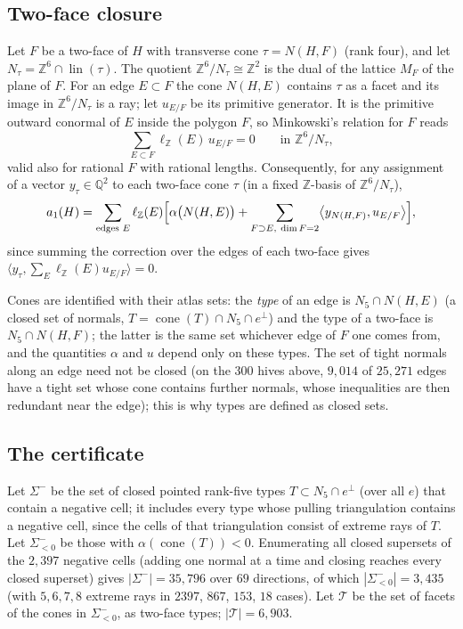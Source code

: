 \documentclass[11pt]{amsart}
\theoremstyle{definition}
\DeclareMathOperator{\cone}{cone}
\newcommand{\Z}{\mathbb{Z}}
\newcommand{\Q}{\mathbb{Q}}
\begin{document}
\subsection{Two-face closure}\label{sec:closure}
Let $F$ be a two-face of $H$ with transverse cone $\tau=N(H,F)$ (rank four),
and let $N_\tau=\Z^{6}\cap\operatorname{lin}(\tau)$. The quotient
$\Z^{6}/N_\tau\cong\Z^{2}$ is the dual of the lattice $M_F$ of the plane of
$F$. For an edge $E\subset F$ the cone $N(H,E)$ contains $\tau$ as a facet and
its image in $\Z^{6}/N_\tau$ is a ray; let $u_{E/F}$ be its primitive
generator. It is the primitive outward conormal of $E$ inside the polygon $F$,
so Minkowski's relation for $F$ reads
\begin{equation}\label{eq:polygon}
  \sum_{E\subset F}\ell_{\Z}(E)\,u_{E/F}=0\qquad\text{in }\Z^{6}/N_\tau,
\end{equation}
valid also for rational $F$ with rational lengths. Consequently, for any
assignment of a vector $y_\tau\in\Q^{2}$ to each two-face cone $\tau$ (in a
fixed $\Z$-basis of $\Z^{6}/N_\tau$),
\begin{equation}\label{eq:corrected}
  a_1(H)=\sum_{\text{edges }E}\ell_{\Z}(E)\Bigl[\alpha\bigl(N(H,E)\bigr)
  +\sum_{F\supset E,\ \dim F=2}\bigl\langle y_{N(H,F)},u_{E/F}\bigr\rangle\Bigr],
\end{equation}
since summing the correction over the edges of each two-face gives
$\langle y_\tau,\sum_E\ell_{\Z}(E)u_{E/F}\rangle=0$.

Cones are identified with their atlas sets: the \emph{type} of an edge is
$N_5\cap N(H,E)$ (a closed set of normals, $T=\cone(T)\cap N_5\cap e^{\perp}$)
and the type of a two-face is $N_5\cap N(H,F)$; the latter is the same set
whichever edge of $F$ one comes from, and the quantities $\alpha$ and $u$ depend
only on these types. The set of tight normals along an edge need not be closed
(on the $300$ hives above, $9{,}014$ of $25{,}271$ edges have a tight set whose
cone contains further normals, whose inequalities are then redundant near the
edge); this is why types are defined as closed sets.

\subsection{The certificate}\label{sec:certificate}
Let $\Sigma^{-}$ be the set of closed pointed rank-five types
$T\subset N_5\cap e^{\perp}$ (over all $e$) that contain a negative cell; it
includes every type whose pulling triangulation contains a negative cell, since
the cells of that triangulation consist of extreme rays of $T$. Let
$\Sigma^{-}_{<0}$ be those with $\alpha(\cone(T))<0$. Enumerating all closed
supersets of the $2{,}397$ negative cells (adding one normal at a time and
closing reaches every closed superset) gives $|\Sigma^{-}|=35{,}796$ over $69$
directions, of which
$|\Sigma^{-}_{<0}|=3{,}435$ (with $5,6,7,8$ extreme rays in $2397$, $867$,
$153$, $18$ cases). Let $\mathcal T$ be the set of facets of the cones in
$\Sigma^{-}_{<0}$, as two-face types; $|\mathcal T|=6{,}903$.
\end{document}
